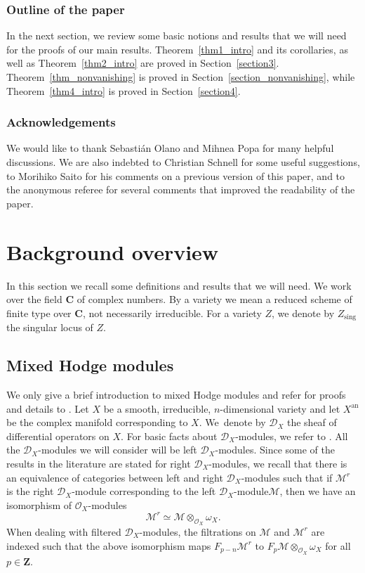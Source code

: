 \documentclass[11pt]{article}
\numberwithin{equation}{section}
\newcommand{\DXmodule}{$\cD_X$\nobreakdash-mod\-ule\xspace}
\newcommand{\DXmodules}{$\cD_X$\nobreakdash-mod\-ules\xspace}
\theoremstyle{plain}
\theoremstyle{definition}
\newcommand\Z{{\mathbf Z}}
\newcommand\C{{\mathbf C}}
\newcommand\cD{\mathcal{D}}
\newcommand\cO{\mathcal{O}}
\newcommand\cM{\mathcal{M}}
\newcommand\cO{\mathcal{O}}
\newcommand\sing{\mathrm{sing}}
\begin{document}
\subsubsection*{Outline of the paper}
In the next section, we review some basic notions and results that we will need for the proofs of our main results.
Theorem~\ref{thm1_intro} and its corollaries, as well as Theorem~\ref{thm2_intro} are proved in Section~\ref{section3}. Theorem~\ref{thm_nonvanishing}
is proved in Section~\ref{section_nonvanishing},
while Theorem~\ref{thm4_intro} is proved in Section~\ref{section4}.

\subsubsection*{Acknowledgements}
We would like to thank Sebastián Olano and Mihnea Popa for many helpful discussions.
We are also indebted to Christian Schnell for some useful suggestions, to Morihiko Saito for his comments on a previous version of this paper, and to the anonymous referee
for several comments that improved the readability of the paper.

\section{Background overview}\label{section2}

In this section we recall some definitions and results that we will need.
We work over the field $\C$ of complex numbers. By a variety we mean a reduced scheme of finite type over $\C$, not necessarily irreducible.
For a variety $Z$, we denote by $Z_\sing$ the singular locus of $Z$.

\subsection{Mixed Hodge modules}\label{section_MHM} We only give a brief introduction to mixed Hodge modules and refer for proofs and details to \cite{Saito_MHM}.
Let $X$ be a smooth, irreducible, $n$-dimensional variety and let $X^\mathrm{an}$ be the complex manifold corresponding to $X$. We~\hbox{denote} by $\cD_X$ the sheaf of differential operators on $X$. For basic facts about \DXmodules,
we refer to \cite{HTT}. All the \DXmodules we will consider will be left \DXmodules. Since some of the results in the literature are stated for
right \DXmodules, we recall that there is an equivalence of categories between left and right \DXmodules such that if $\cM^r$ is the right
\DXmodule corresponding to the left \DXmodule $\cM$, then we have an isomorphism of $\cO_X$-modules
\[\cM^r\simeq\cM\otimes_{\cO_X}\omega_X.\]
When dealing with filtered \DXmodules, the filtrations on $\cM$ and $\cM^r$ are indexed such that
the above isomorphism maps $F_{p-n}\cM^r$ to $F_p\cM\otimes_{\cO_X}\omega_X$ for all $p\in\Z$.
\end{document}

